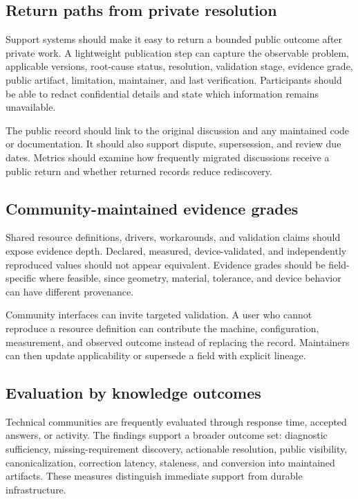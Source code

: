 \subsection{Return paths from private resolution}

Support systems should make it easy to return a bounded public outcome after private work. A lightweight publication step can capture the observable problem, applicable versions, root-cause status, resolution, validation stage, evidence grade, public artifact, limitation, maintainer, and last verification. Participants should be able to redact confidential details and state which information remains unavailable.

The public record should link to the original discussion and any maintained code or documentation. It should also support dispute, supersession, and review due dates. Metrics should examine how frequently migrated discussions receive a public return and whether returned records reduce rediscovery.

\subsection{Community-maintained evidence grades}

Shared resource definitions, drivers, workarounds, and validation claims should expose evidence depth. Declared, measured, device-validated, and independently reproduced values should not appear equivalent. Evidence grades should be field-specific where feasible, since geometry, material, tolerance, and device behavior can have different provenance.

Community interfaces can invite targeted validation. A user who cannot reproduce a resource definition can contribute the machine, configuration, measurement, and observed outcome instead of replacing the record. Maintainers can then update applicability or supersede a field with explicit lineage.

\subsection{Evaluation by knowledge outcomes}

Technical communities are frequently evaluated through response time, accepted answers, or activity. The findings support a broader outcome set: diagnostic sufficiency, missing-requirement discovery, actionable resolution, public visibility, canonicalization, correction latency, staleness, and conversion into maintained artifacts. These measures distinguish immediate support from durable infrastructure.
